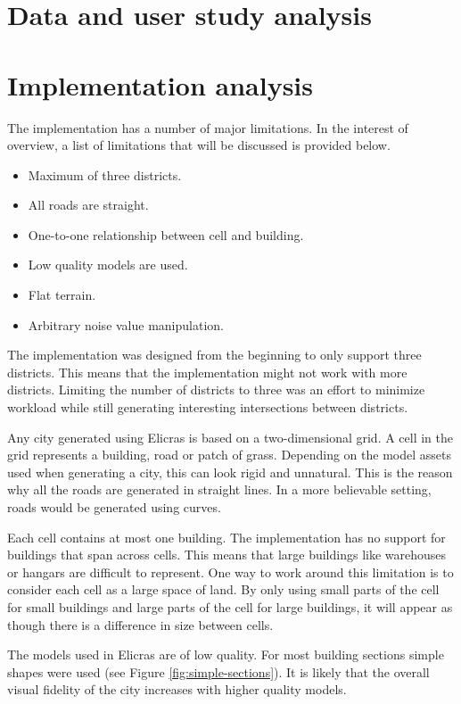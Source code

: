 \section{Data and user study analysis}
	
\section{Implementation analysis}
The implementation has a number of major limitations. In the interest of overview, a list of limitations that will be discussed is provided below.
	
\begin{itemize}
	\item Maximum of three districts.
	\item All roads are straight.
	\item One-to-one relationship between cell and building.
	\item Low quality models are used.
	\item Flat terrain.
	\item Arbitrary noise value manipulation.
\end{itemize}
	
The implementation was designed from the beginning to only support three districts. This means that the implementation might not work with more districts. Limiting the number of districts to three was an effort to minimize workload while still generating interesting intersections between districts.
\par
Any city generated using Elicras is based on a two-dimensional grid. A cell in the grid represents a building, road or patch of grass. Depending on the model assets used when generating a city, this can look rigid and unnatural. This is the reason why all the roads are generated in straight lines. In a more believable setting, roads would be generated using curves\cite{CurvedRoads}.
\par
Each cell contains at most one building. The implementation has no support for buildings that span across cells. This means that large buildings like warehouses or hangars are difficult to represent. One way to work around this limitation is to consider each cell as a large space of land. By only using small parts of the cell for small buildings and large parts of the cell for large buildings, it will appear as though there is a difference in size between cells.
\par
The models used in Elicras are of low quality. For most building sections simple shapes were used (see Figure \ref{fig:simple-sections}). It is likely that the overall visual fidelity of the city increases with higher quality models.

